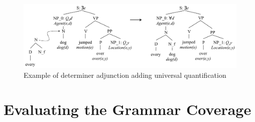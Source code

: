 \documentclass[11pt,a4paper]{article}
\begin{document}
\begin{figure}[h]
\begin{centering}
    \includegraphics[width= \linewidth ]{resources/ch5_resources/neo_universal.pdf}
    \caption{Example of determiner adjunction adding universal quantification}
    \label{fig:neo_universal}
\end{centering}
\end{figure}

\section{Evaluating the Grammar Coverage}
\end{document}
